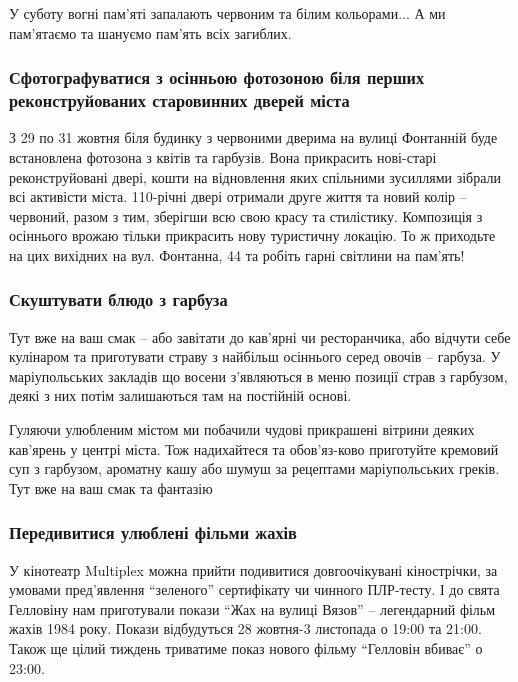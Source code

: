 У суботу вогні пам'яті запалають червоним та білим кольорами... А ми пам'ятаємо
та шануємо пам'ять всіх загиблих.


\subsubsection{Сфотографуватися з осінньою фотозоною біля перших реконструйованих старовинних дверей міста}

З 29 по 31 жовтня біля будинку з червоними дверима на вулиці Фонтанній буде
встановлена фотозона з квітів та гарбузів. Вона прикрасить нові-старі
реконструйовані двері, кошти на відновлення яких спільними зусиллями зібрали
всі активісти міста. 110-річні двері отримали друге життя та новий колір –
червоний, разом з тим, зберігши всю свою красу та стилістику. Композиція з
осіннього врожаю тільки прикрасить нову туристичну локацію. То ж приходьте на
цих вихідних на вул. Фонтанна, 44 та робіть гарні світлини на пам'ять!


\subsubsection{Скуштувати блюдо з гарбуза}

Тут вже на ваш смак – або завітати до кав'ярні чи ресторанчика, або відчути
себе кулінаром та приготувати страву з найбільш осіннього серед овочів –
гарбуза. У маріупольських закладів що восени з'являються в меню позиції страв з
гарбузом, деякі з них потім залишаються там на постійній основі.

Гуляючи улюбленим містом ми побачили чудові прикрашені вітрини деяких кав'ярень
у центрі міста. Тож надихайтеся та обов'яз\hyp{}ково приготуйте кремовий суп з
гарбузом, ароматну кашу або шумуш за рецептами маріупольських греків. Тут вже
на ваш смак та фантазію 🙂


\subsubsection{Передивитися улюблені фільми жахів}

У кінотеатр Multiplex можна прийти подивитися довгоочікувані кінострічки, за
умовами пред'явлення \enquote{зеленого} сертифікату чи чинного ПЛР-тесту. І до свята
Гелловіну нам приготували покази \enquote{Жах на вулиці Вязов} – легендарний фільм
жахів 1984 року. Покази відбудуться 28 жовтня-3 листопада о 19:00 та 21:00.
Також ще цілий тиждень триватиме показ нового фільму \enquote{Гелловін вбиває} о 23:00.

